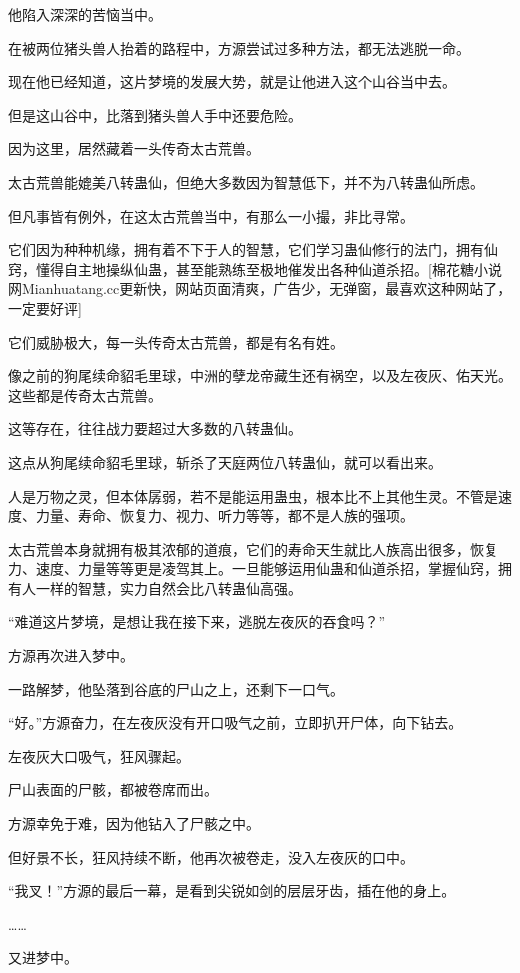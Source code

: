 \begin{this_body}
他陷入深深的苦恼当中。

在被两位猪头兽人抬着的路程中，方源尝试过多种方法，都无法逃脱一命。

现在他已经知道，这片梦境的发展大势，就是让他进入这个山谷当中去。

但是这山谷中，比落到猪头兽人手中还要危险。

因为这里，居然藏着一头传奇太古荒兽。

太古荒兽能媲美八转蛊仙，但绝大多数因为智慧低下，并不为八转蛊仙所虑。

但凡事皆有例外，在这太古荒兽当中，有那么一小撮，非比寻常。

它们因为种种机缘，拥有着不下于人的智慧，它们学习蛊仙修行的法门，拥有仙窍，懂得自主地操纵仙蛊，甚至能熟练至极地催发出各种仙道杀招。[棉花糖小说网Mianhuatang.cc更新快，网站页面清爽，广告少，无弹窗，最喜欢这种网站了，一定要好评]

它们威胁极大，每一头传奇太古荒兽，都是有名有姓。

像之前的狗尾续命貂毛里球，中洲的孽龙帝藏生还有祸空，以及左夜灰、佑天光。这些都是传奇太古荒兽。

这等存在，往往战力要超过大多数的八转蛊仙。

这点从狗尾续命貂毛里球，斩杀了天庭两位八转蛊仙，就可以看出来。

人是万物之灵，但本体孱弱，若不是能运用蛊虫，根本比不上其他生灵。不管是速度、力量、寿命、恢复力、视力、听力等等，都不是人族的强项。

太古荒兽本身就拥有极其浓郁的道痕，它们的寿命天生就比人族高出很多，恢复力、速度、力量等等更是凌驾其上。一旦能够运用仙蛊和仙道杀招，掌握仙窍，拥有人一样的智慧，实力自然会比八转蛊仙高强。

“难道这片梦境，是想让我在接下来，逃脱左夜灰的吞食吗？”

方源再次进入梦中。

一路解梦，他坠落到谷底的尸山之上，还剩下一口气。

“好。”方源奋力，在左夜灰没有开口吸气之前，立即扒开尸体，向下钻去。

左夜灰大口吸气，狂风骤起。

尸山表面的尸骸，都被卷席而出。

方源幸免于难，因为他钻入了尸骸之中。

但好景不长，狂风持续不断，他再次被卷走，没入左夜灰的口中。

“我叉！”方源的最后一幕，是看到尖锐如剑的层层牙齿，插在他的身上。

……

又进梦中。


\end{this_body}
